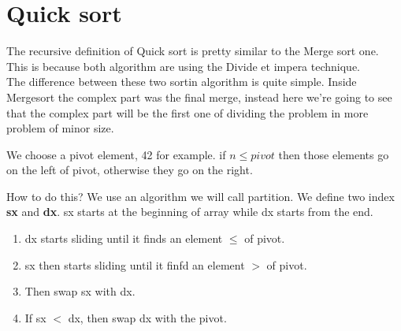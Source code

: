 \documentclass{article}
\begin{document}
\section{Quick sort}
The recursive definition of Quick sort is pretty similar to the Merge sort one. This is because both algorithm are using the Divide et impera technique.\\
The difference between these two sortin algorithm is quite simple. Inside Mergesort the complex part was the final merge, instead here we're going to see that the complex part will be the first one of dividing the problem in more problem of minor size.
\begin{center}

We choose a pivot element, 42 for example. if $ n \leq pivot$  then those elements go on the left of pivot, otherwise they go on the right.\\
\end{center}

How to do this? We use an algorithm we will call partition. We define two index \textbf{sx} and \textbf{dx}. sx starts at the beginning of array while dx starts from the end.\\
\begin{enumerate}
\item dx starts sliding until it finds an element $\leq$ of pivot.
\item sx then starts sliding until it finfd an element $>$ of pivot.
\item Then swap sx with dx.
\item If sx $<$ dx, then swap dx with the pivot.
\end{enumerate}
\end{document}
